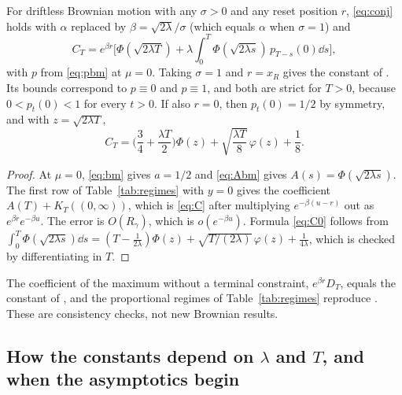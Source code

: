 \documentclass[11pt,a4paper]{article}
\begin{document}
\begin{corollary}\label{cor:brownian}
For driftless Brownian motion with any $\sigma>0$ and any reset position $r$, \eqref{eq:conj} holds with $\alpha$ replaced by $\beta=\sqrt{2\lambda}/\sigma$ (which equals $\alpha$ when $\sigma=1$) and
\begin{equation}\label{eq:C}
 C_T=e^{\beta r}\Big[\Phi(\sqrt{2\lambda T})+\lambda\int_0^T\Phi(\sqrt{2\lambda s})\,p_{T-s}(0)\dd s\Big],
\end{equation}
with $p$ from \eqref{eq:pbm} at $\mu=0$. Taking $\sigma=1$ and $r=x_R$ gives the constant of \cite[Remark~3]{DHM2026}. Its bounds correspond to $p\equiv0$ and $p\equiv1$, and both are strict for $T>0$, because $0<p_t(0)<1$ for every $t>0$. If also $r=0$, then $p_t(0)=1/2$ by symmetry, and with $z=\sqrt{2\lambda T}$,
\begin{equation}\label{eq:C0}
 C_T=\Big(\frac34+\frac{\lambda T}{2}\Big)\Phi(z)+\sqrt{\frac{\lambda T}{8}}\,\varphi(z)+\frac18 .
\end{equation}
\end{corollary}

\begin{proof}
At $\mu=0$, \eqref{eq:bm} gives $a=1/2$ and \eqref{eq:Abm} gives $A(s)=\Phi(\sqrt{2\lambda s})$. The first row of Table~\ref{tab:regimes} with $y=0$ gives the coefficient $A(T)+K_T((0,\infty))$, which is \eqref{eq:C} after multiplying $e^{-\beta(u-r)}$ out as $e^{\beta r}e^{-\beta u}$. The error is $O(R_\gamma)$, which is $o(e^{-\beta u})$. Formula \eqref{eq:C0} follows from $\int_0^T\Phi(\sqrt{2\lambda s})\dd s=(T-\frac1{2\lambda})\Phi(z)+\sqrt{T/(2\lambda)}\,\varphi(z)+\frac1{4\lambda}$, which is checked by differentiating in $T$.
\end{proof}

The coefficient of the maximum without a terminal constraint, $e^{\beta r}D_T$, equals the constant of \cite[Theorem~5]{DHM2026}, and the proportional regimes of Table~\ref{tab:regimes} reproduce \cite[Theorem~6]{DHM2026}. These are consistency checks, not new Brownian results.

\subsection{How the constants depend on \texorpdfstring{$\lambda$}{lambda} and \texorpdfstring{$T$}{T}, and when the asymptotics begin}\label{sec:onset}
\end{document}
